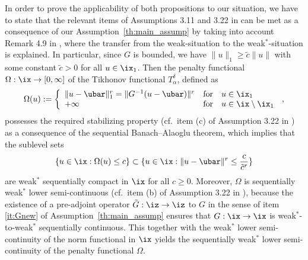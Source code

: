 \documentclass[10pt]{article}
\theoremstyle{definition}
\newtheorem{remark}[theorem]{Remark}
\begin{document}
In order to prove the applicability of both propositions to our situation, we have to state that the relevant items of Assumptions 3.11 and 3.22 in \cite{Schusterbuch12} can be met as a consequence of our Assumption~\ref{th:main_assump} by taking into account Remark 4.9 in \cite{Schusterbuch12}, where the transfer from the weak-situation to the weak$^*$-situation is explained. In particular, since $G$ is bounded, we have $\|u\|_1 \ge \tilde c \|u\|$ with some constant $\tilde c>0$ for all $u \in \ix_1$.
Then the penalty functional $\Omega: \ix \to [0,\infty]$ of the Tikhonov functional $T_\alpha^\delta$,  defined as
$$ \Omega(u):= \left\{\begin{array}{lcl} \|u-\ubar\|_1^r=\|G^{-1}(u-\ubar )\|^r & \mbox{for} & u \in \ix_1\\ +\infty & \mbox{for} & u \in \ix \setminus \ix_1\end{array} \right.\,,$$
possesses the required stabilizing property (cf.~item (c) of Assumption 3.22 in \cite{Schusterbuch12}) as a consequence of the sequential Banach--Alaoglu theorem, which implies that the sublevel sets $$\{u \in \ix: \Omega(u) \le c\} \subset \{u \in \ix: \|u-\ubar \|^r \le \frac{c}{\tilde c^r}\} $$ are weak$^*$ sequentially compact in $\ix$ for all $c \ge 0$.
Moreover, $\Omega$ is sequentially weak$^*$ lower semi-continuous (cf.~item (b) of Assumption 3.22 in \cite{Schusterbuch12}), because the existence of a pre-adjoint operator $\tilde G: \iz \to \iz$ to $G$ in the sense of item \ref{it:Gnew} of Assumption~\ref{th:main_assump} ensures that
$G: \ix \to \ix$ is weak$^*$-to-weak$^*$ sequentially continuous. This together with the weak$^*$ lower semi-continuity of the norm functional in $\ix$ yields the sequentially weak$^*$ lower semi-continuity of the penalty functional $\Omega$.
%
%
%
%
\end{document}
